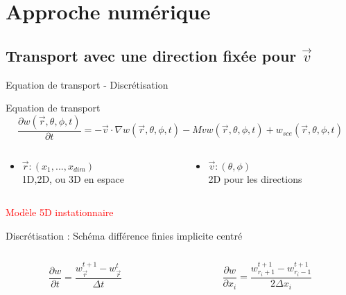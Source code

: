 \section{Approche numérique}

\subsection{Transport avec une direction fixée pour $\vec{v}$}
\begin{frame}{Equation de transport - Discrétisation}

  \begin{block}{Equation de transport}
    \begin{equation*}
      \frac{\partial w(\vec{r}, \theta, \phi, t)}{\partial t} = -\vec{v} \cdot \nabla w(\vec{r}, \theta, \phi, t) - M v w(\vec{r}, \theta, \phi, t) + 
      w_{sce}(\vec{r}, \theta, \phi, t)
    \end{equation*}
    
    \begin{columns}[c]
      \begin{column}{5cm}
        \begin{itemize}
        \item $\vec{r} : (x_1,...,x_{dim})$ \\
          1D,2D, ou 3D en espace
        \end{itemize}
      \end{column}
      \begin{column}{5cm}
        \begin{itemize}
        \item $\vec{v} : (\theta, \phi)$ \\
          2D pour les directions
        \end{itemize}
      \end{column}
    \end{columns}

    \begin{center}
      \textcolor{red}{Modèle 5D instationnaire}
    \end{center}
  \end{block}

  \begin{alertblock}{Discrétisation : Schéma différence finies implicite centré}
    \begin{columns}[c]
      \begin{column}{6cm}
        \begin{equation*}
          \frac{\partial w}{\partial t} = \frac{w^{t+1}_{\vec{r}} - w^t_{\vec{r}}}{\Delta t}
        \end{equation*}
      \end{column}
      \begin{column}{6cm}
        \begin{equation*}
          \frac{\partial w}{\partial x_i} = \frac{w^{t+1}_{r_i + 1} - w^{t+1}_{r_i - 1}}{2\Delta x_i}
        \end{equation*}
      \end{column}
    \end{columns} 


\end{alertblock}
\end{frame}

